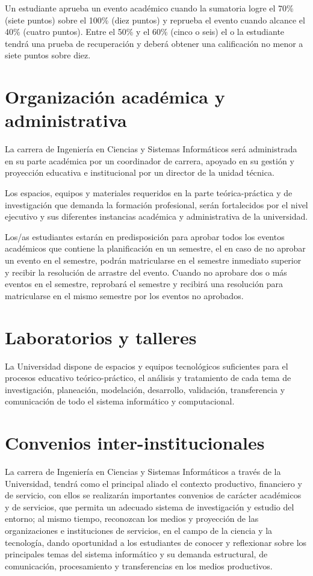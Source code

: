 Un estudiante aprueba un evento académico cuando la sumatoria logre el 70\%  (siete puntos) 
sobre el 100\% (diez puntos) y reprueba el evento cuando alcance el 40\%  (cuatro puntos). 
Entre el 50\% y el 60\%  (cinco o seis) el o la estudiante tendrá una prueba de 
recuperación y deberá obtener una calificación no menor a siete puntos sobre diez. 
 
\section{Organización académica y administrativa}
La carrera de Ingeniería  en  Ciencias  y Sistemas Informáticos será administrada en 
su parte académica por un coordinador de carrera, apoyado  en su gestión  y proyección 
educativa e institucional  por un director de  la unidad técnica. 

Los espacios, equipos y materiales requeridos  en la parte teórica-práctica y de 
investigación que demanda la  formación profesional, serán fortalecidos por el nivel 
ejecutivo y sus  diferentes instancias académica y administrativa de la universidad.   

Los/as  estudiantes estarán en predisposición para aprobar  todos los eventos académicos 
que contiene la planificación en un semestre, el en caso de no aprobar un evento en el semestre, 
podrán matricularse en el semestre inmediato superior y recibir la resolución de arrastre del 
evento. Cuando no aprobare dos o más eventos en el semestre, reprobará el semestre y 
recibirá una resolución para matricularse en el mismo semestre por los eventos no aprobados.   

\section{Laboratorios y talleres}
La Universidad  dispone de espacios y equipos tecnológicos  suficientes para el procesos 
educativo teórico-práctico,  el  análisis y tratamiento  de cada tema de investigación, 
planeación, modelación, desarrollo, validación, transferencia y comunicación de todo el 
sistema informático y computacional.  

\section{Convenios inter-institucionales}
La carrera de Ingeniería en Ciencias y Sistemas  Informáticos  a través de la Universidad, 
tendrá como el principal aliado el contexto productivo, financiero y de servicio, con ellos
 se realizarán importantes convenios de carácter académicos y de servicios, que permita un 
adecuado sistema de  investigación y estudio del entorno;  al mismo tiempo, reconozcan 
los medios y proyección de las organizaciones e instituciones de servicios, en el campo 
de  la ciencia y la tecnología, dando oportunidad a los estudiantes de   conocer y 
reflexionar sobre los principales temas  del sistema informático y su demanda estructural, 
de comunicación, procesamiento y transferencias  en los  medios productivos.
